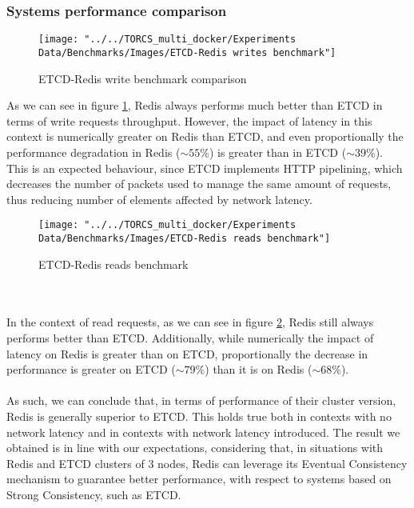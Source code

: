\subsubsection{Systems performance comparison}
\begin{figure}[h!]
	\centering
	\texttt{[image: "../../TORCS\_multi\_docker/Experiments Data/Benchmarks/Images/ETCD-Redis writes benchmark"]}
	\caption[ETCD-Redis write benchmark comparison]{ETCD-Redis write benchmark comparison}
	\label{fig:etcd-redis-writes-benchmark}
\end{figure}
As we can see in figure \ref{fig:etcd-redis-writes-benchmark}, Redis always performs much better than ETCD in terms of write requests throughput. However, the impact of latency in this context is numerically greater on Redis than ETCD, and even proportionally the performance degradation in Redis ($\sim{}55\%$) is greater than in ETCD ($\sim{}39\%$). \\
This is an expected behaviour, since ETCD implements HTTP pipelining, which decreases the number of packets used to manage the same amount of requests, thus reducing number of elements affected by network latency.
\begin{figure}
	\centering
	\texttt{[image: "../../TORCS\_multi\_docker/Experiments Data/Benchmarks/Images/ETCD-Redis reads benchmark"]}
	\caption[ETCD-Redis reads benchmark]{ETCD-Redis reads benchmark}
	\label{fig:etcd-redis-reads-benchmark}
\end{figure}
\\ \\ In the context of read requests, as we can see in figure \ref{fig:etcd-redis-reads-benchmark}, Redis still always performs better than ETCD. Additionally, while numerically the impact of latency on Redis is greater than on ETCD, proportionally the decrease in performance is greater on ETCD ($\sim{}79\%$) than it is on Redis ($\sim{}68\%$). \\ \\
As such, we can conclude that, in terms of performance of their cluster version, Redis is generally superior to ETCD. This holds true both in contexts with no network latency and in contexts with network latency introduced. The result we obtained is in line with our expectations, considering that, in situations with Redis and ETCD clusters of 3 nodes, Redis can leverage its Eventual Consistency mechanism to guarantee better performance, with respect to systems based on Strong Consistency, such as ETCD.

